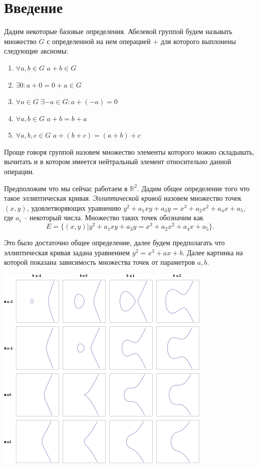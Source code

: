 \documentclass[a4paper,12pt]{article}
\begin{document}
    \section{Введение}
        Дадим некоторые базовые определения.
        Абелевой группой будем называть множество $G$ с определенной на нем операцией $+$ для которого выплонены следующие аксиомы:
        \begin{enumerate}
            \item $\forall a, b \in G$ $a + b \in G$
            \item $\exists 0 : a + 0 = 0 + a \in G$
            \item $\forall a \in G$ $\exists -a \in G : a + (-a) = 0$
            \item $\forall a, b \in G$ $a + b = b + a$
            \item $\forall a, b, c \in G$ $a + (b + c) = (a + b) + c$
        \end{enumerate}
        Проще говоря группой назовем множество элементы которого можно складывать, 
        вычитать и в котором имеется нейтральный элемент относительно данной операции.

        Предположим что мы сейчас работаем в $\mathbb{R}^2$.
        Дадим общее определение того что такое эллиптическая кривая. \textit{Эллиптической кривой} назовем множество точек $(x, y)$,
        удовлетворяющих уравнению $y^2 + a_1xy+a_3y = x^3+a_2x^2+a_4x + a_5$, где $a_i$ -- некоторый числа.
        Множество таких точек обозначим как 
        $$
            E = \{(x, y) | y^2 + a_1xy+a_3y = x^3+a_2x^2+a_4x + a_5\}.
        $$

        Это было достаточно общее определение, далее будем предполагать что эллиптическая кривая задана уравнением
        $y^2 = x^3 + ax + b$. Далее картинка на которой показана зависимость множества точек от параметров $a, b$.

        \includegraphics{EC}
\end{document}
